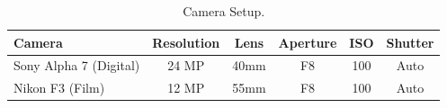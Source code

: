 \begin{table}
    \centering
    \caption{Camera Setup.}
    \begin{tabular}{lccccc}
        \toprule
        \textbf{Camera} & \textbf{Resolution} & \textbf{Lens} & \textbf{Aperture} & \textbf{ISO} & \textbf{Shutter} \\
        \midrule
        Sony Alpha 7 (Digital) & 24 MP & 40mm & F8 & 100 & Auto \\
        Nikon F3 (Film) & 12 MP & 55mm & F8 & 100 & Auto\\
        \bottomrule
    \end{tabular}
    \label{tab:cameras}
\end{table}



